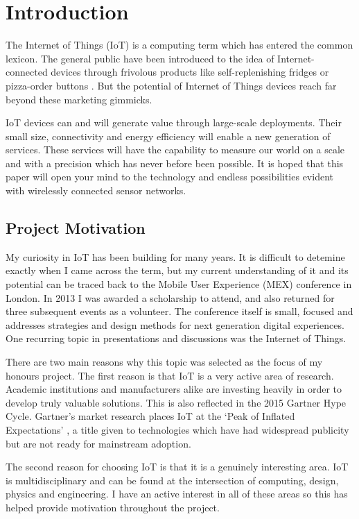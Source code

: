 \chapter{Introduction}
  The Internet of Things (IoT) is a computing term which has entered the common lexicon. The general public have been introduced to the idea of Internet-connected devices through frivolous products like self-replenishing fridges or pizza-order buttons \citep{dominos-order}. But the potential of Internet of Things devices reach far beyond these marketing gimmicks.

  IoT devices can and will generate value through large-scale deployments. Their small size, connectivity and energy efficiency will enable a new generation of services. These services will have the capability to measure our world on a scale and with a precision which has never before been possible. It is hoped that this paper will open your mind to the technology and endless possibilities evident with wirelessly connected sensor networks.

  \section{Project Motivation}
    My curiosity in IoT has been building for many years. It is difficult to detemine exactly when I came across the term, but my current understanding of it and its potential can be traced back to the Mobile User Experience (MEX) conference in London. In 2013 I was awarded a scholarship to attend, and also returned for three subsequent events as a volunteer. The conference itself is small, focused and addresses strategies and design methods for next generation digital experiences. One recurring topic in presentations and discussions was the Internet of Things.

    There are two main reasons why this topic was selected as the focus of my honours project. The first reason is that IoT is a very active area of research. Academic institutions and manufacturers alike are investing heavily in order to develop truly valuable solutions. This is also reflected in the 2015 Gartner Hype Cycle. Gartner's market research places IoT at the `Peak of Inflated Expectations' \citep{gartner-hype-cycle}, a title given to technologies which have had widespread publicity but are not ready for mainstream adoption.

    The second reason for choosing IoT is that it is a genuinely interesting area. IoT is multidisciplinary and can be found at the intersection of computing, design, physics and engineering. I have an active interest in all of these areas so this has helped provide motivation throughout the project.

